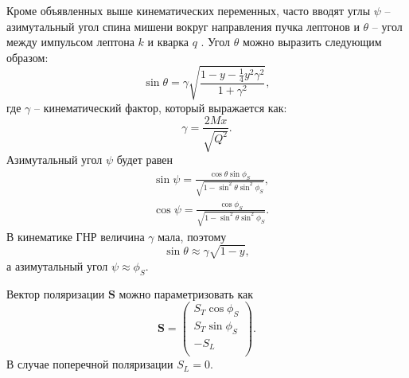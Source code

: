 \documentclass{extreport}
\begin{document}
Кроме объявленных выше кинематических переменных, часто вводят углы $\psi$ -- азимутальный угол спина мишени вокруг направления пучка лептонов и $\theta$ -- угол между импульсом лептона $k$ и кварка $q$ \cite{Diehl}. Угол $\theta$ можно выразить следующим образом:
\begin{equation}
	\sin \theta = \gamma \sqrt{\frac{1-y-\frac{1}{4}y^2 \gamma^2}{1+\gamma^2}},
\end{equation} 
где $\gamma$ -- кинематический фактор, который выражается как:
\begin{equation}
	\gamma = \frac{2Mx}{\sqrt{Q^2}}.
\end{equation}
Азимутальный угол $\psi$ будет равен
\begin{equation}
	\begin{split}
		 & \sin \psi = \frac{\cos \theta \sin \phi_S}{\sqrt{1-\sin^2 \theta \sin^2 \phi_S}}, \\
		 & \cos \psi = \frac{\cos \phi_S}{\sqrt{1-\sin^2 \theta \sin^2 \phi_S}}.
	\end{split}
\end{equation}
В кинематике ГНР величина $\gamma$ мала, поэтому
\begin{equation}
	\sin \theta \approx \gamma \sqrt{1-y},
\end{equation}
а азимутальный угол $\psi \approx \phi_S$.

Вектор поляризации $\textbf{S}$ можно параметризовать как
\begin{equation}
	\textbf{S} = \begin{pmatrix}
			S_T \cos \phi_S \\ S_T \sin \phi_S\\ -S_L \\ 
	\end{pmatrix}.
\end{equation}
В случае поперечной поляризации $S_L = 0$.
\end{document}
